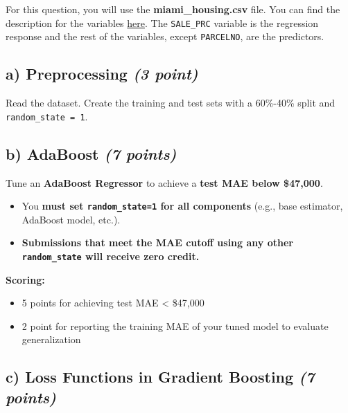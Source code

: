 \documentclass[
  letterpaper,
  DIV=11,
  numbers=noendperiod]{scrreprt}
\providecommand{\tightlist}{%
  \setlength{\itemsep}{0pt}\setlength{\parskip}{0pt}}\usepackage{longtable,booktabs,array}
\begin{document}
For this question, you will use the \textbf{miami\_housing.csv} file.
You can find the description for the variables
\href{https://www.kaggle.com/datasets/deepcontractor/miami-housing-dataset}{here}.
The \texttt{SALE\_PRC} variable is the regression response and the rest
of the variables, except \texttt{PARCELNO}, are the predictors.

\subsection{\texorpdfstring{a) Preprocessing \emph{(3
point)}}{a) Preprocessing (3 point)}}\label{a-preprocessing-3-point}

Read the dataset. Create the training and test sets with a 60\%-40\%
split and \texttt{random\_state\ =\ 1}.

\subsection{\texorpdfstring{b) AdaBoost \emph{(7
points)}}{b) AdaBoost (7 points)}}\label{b-adaboost-7-points}

Tune an \textbf{AdaBoost Regressor} to achieve a \textbf{test MAE below
\$47,000}.

\begin{itemize}
\tightlist
\item
  You \textbf{must set \texttt{random\_state=1} for all components}
  (e.g., base estimator, AdaBoost model, etc.).
\item
  \textbf{Submissions that meet the MAE cutoff using any other
  \texttt{random\_state} will receive zero credit.}
\end{itemize}

\textbf{Scoring:}

\begin{itemize}
\tightlist
\item
  5 points for achieving test MAE \textless{} \$47,000
\item
  2 point for reporting the training MAE of your tuned model to evaluate
  generalization
\end{itemize}

\subsection{\texorpdfstring{c) Loss Functions in Gradient Boosting
\emph{(7
points)}}{c) Loss Functions in Gradient Boosting (7 points)}}\label{c-loss-functions-in-gradient-boosting-7-points}
\end{document}
